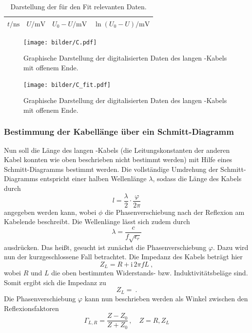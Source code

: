 \begin{table}[htpb]
  \centering
  \begin{tabular}{cccc}
    \midrule
    \midrule
    $t / \si{\nano\second}$ & $U / \si{\milli\volt}$ &
    $U_0 - U / \si{\milli\volt}$ & $\ln(U_0 - U) / \si{\milli\volt}$ \\
    \midrule
    
    \midrule
    \midrule
  \end{tabular}
  \caption{Darstellung der für den Fit relevanten Daten.}
\label{tab:C_fit}
\end{table}

\begin{figure}[htpb]
  \centering
  \texttt{[image: bilder/C.pdf]}
  \caption{Graphische Darstellung der digitalisierten Daten des langen
    \CU-Kabels mit offenem Ende.}
\label{fig:C_roh_Daten}
  \texttt{[image: bilder/C\_fit.pdf]}
  \caption{Graphische Darstellung der digitalisierten Daten des langen
    \CU-Kabels mit offenem Ende.}
\label{fig:C_fit}
\end{figure}


\clearpage
\subsubsection{Bestimmung der Kabellänge über ein Schmitt-Diagramm}
\label{ssub:bestimmung_der_kabell_nge_ber_ein_schmitt_diagramm}

Nun soll die Länge des langen \BU-Kabels (die Leitungskonstanten der anderen
Kabel konnten wie oben beschrieben nicht bestimmt werden) mit Hilfe eines
Schmitt-Diagramms bestimmt werden. Die vollständige Umdrehung der
Schmitt-Diagramms entspricht einer halben Wellenlänge $\lambda$, sodass die
Länge des Kabels durch
\begin{equation}
  l = \frac{\lambda}{2} \cdot \frac{\varphi}{2 \pi}
\end{equation}
angegeben werden kann, wobei $\phi$ die Phasenverschiebung nach der Reflexion
am Kabelende beschreibt. Die Wellenlänge lässt sich zudem durch
\begin{equation}
  \lambda = \frac{c}{f \sqrt{\epsilon_r}}
\end{equation}
ausdrücken.
Das heißt, gesucht ist zunächst die Phasenverschiebung $\varphi$.
Dazu wird nun der kurzgeschlossene Fall betrachtet.
Die Impedanz des Kabels beträgt hier
\begin{equation}
  Z_L = R + \text{i}\, 2 \pi f L~,
\end{equation}
wobei $R$ und $L$ die oben bestimmten Widerstands- bzw. Induktivitätsbeläge
sind. Somit ergibt sich die Impedanz zu
\begin{equation}
  Z_L = ~.
\end{equation}
Die Phasenverschiebung $\varphi$ kann nun beschrieben werden als Winkel
zwischen den Reflexionsfaktoren
\begin{equation}
  \Gamma_{L,R} = \frac{Z - Z_0}{Z + Z_0}\,, \quad Z = R, Z_L
\end{equation}


